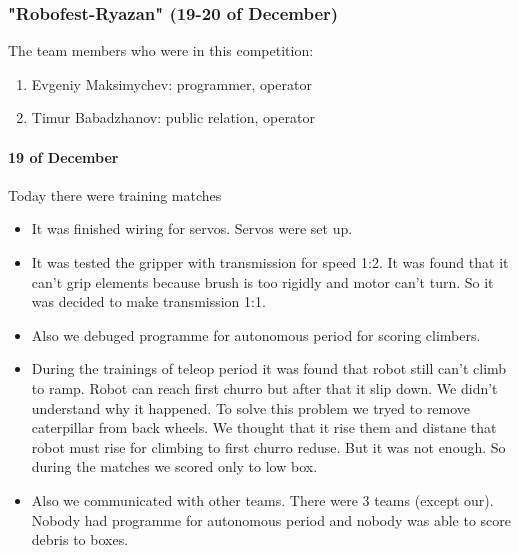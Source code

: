 \subsubsection{"Robofest-Ryazan" (19-20 of December)}
The team members who were in this competition:
\begin{enumerate}
	\item Evgeniy Maksimychev: programmer, operator 
	
	\item Timur Babadzhanov: public relation, operator 
\end{enumerate}
\paragraph{19 of December}
Today there were training matches
\begin{itemize}
	\item It was finished wiring for servos. Servos were set up.
	
	\item It was tested the gripper with transmission for speed 1:2. It was found that it can't grip elements because brush is too rigidly and motor can't turn. So it was decided to make transmission 1:1.
	
	\item Also we debuged programme for autonomous period for scoring climbers.
	
	\item During the trainings of teleop period it was found that robot still can't climb to ramp. Robot can reach first churro but after that it slip down. We didn't understand why it happened. To solve this problem we tryed to remove caterpillar from back wheels. We thought that it rise them and distane that robot must rise for climbing to first churro reduse. But it was not enough. So during the matches we scored only to low box.
	
	\item Also we communicated with other teams. There were 3 teams (except our). Nobody had programme for autonomous period and nobody was able to score debris to boxes.
\end{itemize}
